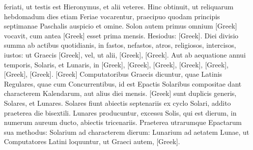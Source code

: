 feriati, ut testis est Hieronymus, et alii veteres.
Hinc obtinuit, ut reliquarum
hebdomadum dies etiam Feriae vocarentur, praecipuo quodam
principis septimanae Paschalis auspicio et omine.
Solon autem
primus omnium \textgreek{[Greek]} vocavit,
 cum antea \textgreek{[Greek]} esset
prima mensis.
Hesiodus: \textgreek{[Greek]}.
Diei divisio summa ab actibus quotidianis, in fastos, nefastos, atros,
religiosos, intercisos, iustos: ut Graecis
 \textgreek{[Greek]}, vel, ut alii,
\textgreek{[Greek]},
 \textgreek{[Greek]}.
Aut ab aequatione annui
temporis, Solaris, et Lunaris, in \textgreek{[Greek]},
 \textgreek{[Greek]}, \textgreek{[Greek]},
\textgreek{[Greek]}, \textgreek{[Greek]},
 \textgreek{[Greek]}, \textgreek{[Greek]}.
\textgreek{[Greek]} Computatoribus
Graecis dicuntur, quae Latinis Regulares, quae cum Concurrentibus,
id est Epactis Solaribus compositae dant characterem Kalendarum,
aut alius diei mensis.
\textgreek{[Greek]} sunt duplicis generis, Solares, et
Lunares.
Solares fiunt abiectis septenariis ex cyclo Solari, addito praeterea
die bisextili.
Lunares producuntur, excessu Solis, qui est  dierum,
in numerum aureum ducto, abiectis tricenariis.
Praeterea utrarumque
Epactarum sua methodus: Solarium ad characterem dierum:
Lunarium ad aetatem Lunae, ut Computatores Latini loquuntur, ut
Graeci autem, \textgreek{[Greek]}.

